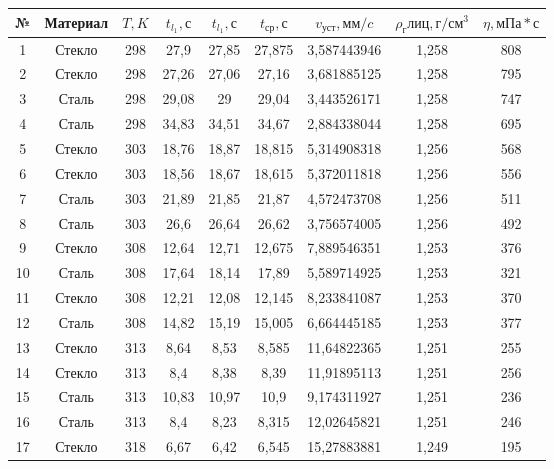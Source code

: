 \documentclass[a4paper, 12pt]{article}
\begin{document}
    \begin{table}[!ht]
        \centering
        \begin{tabular}{|c|c|c|c|c|c|c|c|c|}
        \hline
            № & Материал & $T, K$ & $t_{l_1}, с$& $t_{l_1}, с$ & $t_{ср}, с$ & $v_{уст}, мм/c$ & $\rho_глиц, г/см^3$ & $\eta, мПа * с$  \\ \hline
            1 & Стекло & 298 & 27,9 & 27,85 & 27,875 & 3,587443946 & 1,258  & 808  \\ \hline
            2 & Стекло & 298 & 27,26 & 27,06 & 27,16 & 3,681885125 & 1,258  & 795  \\ \hline
            3 & Сталь & 298 & 29,08 & 29 & 29,04 & 3,443526171 & 1,258  & 747  \\ \hline
            4 & Сталь & 298 & 34,83 & 34,51 & 34,67 & 2,884338044 & 1,258  & 695  \\ \hline
            5 & Стекло & 303 & 18,76 & 18,87 & 18,815 & 5,314908318 & 1,256  & 568  \\ \hline
            6 & Стекло & 303 & 18,56 & 18,67 & 18,615 & 5,372011818 & 1,256  & 556  \\ \hline
            7 & Сталь & 303 & 21,89 & 21,85 & 21,87 & 4,572473708 & 1,256  & 511  \\ \hline
            8 & Сталь & 303 & 26,6 & 26,64 & 26,62 & 3,756574005 & 1,256  & 492  \\ \hline
            9 & Стекло & 308 & 12,64 & 12,71 & 12,675 & 7,889546351 & 1,253  & 376  \\ \hline
            10 & Сталь & 308 & 17,64 & 18,14 & 17,89 & 5,589714925 & 1,253  & 321  \\ \hline
            11 & Стекло & 308 & 12,21 & 12,08 & 12,145 & 8,233841087 & 1,253  & 370  \\ \hline
            12 & Сталь & 308 & 14,82 & 15,19 & 15,005 & 6,664445185 & 1,253  & 377  \\ \hline
            13 & Стекло & 313 & 8,64 & 8,53 & 8,585 & 11,64822365 & 1,251  & 255  \\ \hline
            14 & Стекло & 313 & 8,4 & 8,38 & 8,39 & 11,91895113 & 1,251  & 256  \\ \hline
            15 & Сталь & 313 & 10,83 & 10,97 & 10,9 & 9,174311927 & 1,251  & 236  \\ \hline
            16 & Сталь & 313 & 8,4 & 8,23 & 8,315 & 12,02645821 & 1,251  & 246  \\ \hline
            17 & Стекло & 318 & 6,67 & 6,42 & 6,545 & 15,27883881 & 1,249  & 195  \\ \hline

\end{tabular}
\end{table}
\end{document}
